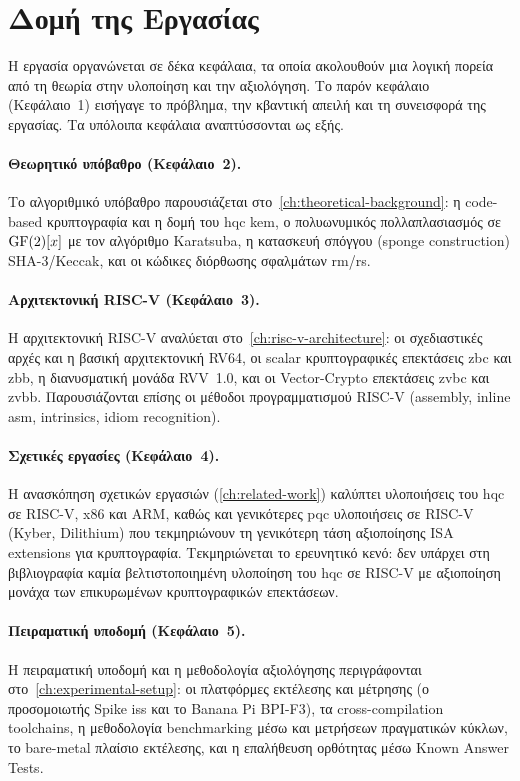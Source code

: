 \section{Δομή της Εργασίας}
\label{sec:structure}

Η εργασία οργανώνεται σε δέκα κεφάλαια, τα οποία ακολουθούν μια λογική
πορεία από τη θεωρία στην υλοποίηση και την αξιολόγηση. Το παρόν κεφάλαιο
(Κεφάλαιο~1) εισήγαγε το πρόβλημα, την κβαντική απειλή και τη συνεισφορά της
εργασίας. Τα υπόλοιπα κεφάλαια αναπτύσσονται ως εξής.

\paragraph{Θεωρητικό υπόβαθρο (Κεφάλαιο~2).}
Το αλγοριθμικό υπόβαθρο παρουσιάζεται στο~\cref{ch:theoretical-background}: η
code-based κρυπτογραφία και η δομή του \gls{hqc} \gls{kem}, ο πολυωνυμικός
πολλαπλασιασμός σε $\mathrm{GF}(2)[x]$ με τον αλγόριθμο Karatsuba, η κατασκευή σπόγγου
(sponge construction) SHA-3/Keccak, και οι κώδικες διόρθωσης σφαλμάτων
\gls{rm}/\gls{rs}.

\paragraph{Αρχιτεκτονική RISC-V (Κεφάλαιο~3).}
Η αρχιτεκτονική RISC-V αναλύεται στο~\cref{ch:risc-v-architecture}: οι
σχεδιαστικές αρχές και η βασική αρχιτεκτονική RV64, οι scalar κρυπτογραφικές
επεκτάσεις \gls{zbc} και \gls{zbb}, η διανυσματική μονάδα RVV~1.0, και οι
Vector-Crypto επεκτάσεις \gls{zvbc} και \gls{zvbb}. Παρουσιάζονται επίσης οι
μέθοδοι προγραμματισμού RISC-V (assembly, inline asm, intrinsics, idiom recognition).

\paragraph{Σχετικές εργασίες (Κεφάλαιο~4).}
Η ανασκόπηση σχετικών εργασιών (\cref{ch:related-work}) καλύπτει υλοποιήσεις
του \gls{hqc} σε RISC-V, x86 και ARM, καθώς και γενικότερες \gls{pqc}
υλοποιήσεις σε RISC-V (Kyber, Dilithium) που τεκμηριώνουν τη γενικότερη τάση
αξιοποίησης ISA extensions για κρυπτογραφία. Τεκμηριώνεται το ερευνητικό κενό: δεν υπάρχει στη βιβλιογραφία καμία βελτιστοποιημένη υλοποίηση του \gls{hqc} σε RISC-V με αξιοποίηση μονάχα των επικυρωμένων κρυπτογραφικών επεκτάσεων.

\paragraph{Πειραματική υποδομή (Κεφάλαιο~5).}
Η πειραματική υποδομή και η μεθοδολογία αξιολόγησης περιγράφονται
στο~\cref{ch:experimental-setup}: οι πλατφόρμες εκτέλεσης και μέτρησης (ο
προσομοιωτής Spike \gls{iss} και το Banana Pi BPI-F3), τα
cross-compilation toolchains, η μεθοδολογία benchmarking μέσω \instret και
μετρήσεων πραγματικών κύκλων, το bare-metal πλαίσιο εκτέλεσης, και η επαλήθευση
ορθότητας μέσω Known Answer Tests.

